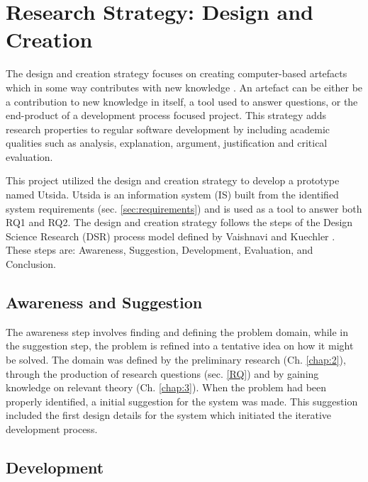 \section{Research Strategy: Design and Creation}

The design and creation strategy focuses on creating computer-based artefacts which in some way contributes with new knowledge \cite{oates2005researching}. An artefact can be either be a contribution to new knowledge in itself, a tool used to answer questions, or the end-product of a development process focused project. This strategy adds research properties to regular software development by including academic qualities such as analysis, explanation, argument, justification and critical evaluation.

This project utilized the design and creation strategy to develop a prototype named Utsida. Utsida is an information system (IS) built from the identified system requirements (sec. \ref{sec:requirements}) and is used as a tool to answer both RQ1 and RQ2. The design and creation strategy follows the steps of the Design Science Research (DSR) process model defined by Vaishnavi and Kuechler \cite{vaishnavi2004design}. These steps are: Awareness, Suggestion, Development, Evaluation, and Conclusion.

\subsection{Awareness and Suggestion}
The awareness step involves finding and defining the problem domain, while in the suggestion step, the problem is refined into a tentative idea on how it might be solved. The domain was defined by the preliminary research (Ch. \ref{chap:2}), through the production of research questions (sec. \ref{RQ}) and by gaining knowledge on relevant theory (Ch. \ref{chap:3}). When the problem had been properly identified, a initial suggestion for the system was made. This suggestion included the first design details for the system which initiated the iterative development process.

\subsection{Development}

